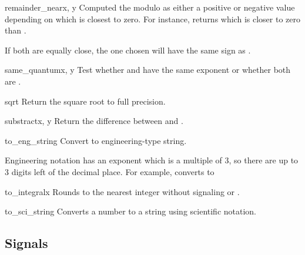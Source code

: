 \begin{methoddesc}{remainder_near}{x, y}
  Computed the modulo as either a positive or negative value depending
  on which is closest to zero.  For instance,
   returns 
  which is closer to zero than .

  If both are equally close, the one chosen will have the same sign
  as .
\end{methoddesc}

\begin{methoddesc}{same_quantum}{x, y}
  Test whether  and  have the same exponent or whether both are
  .
\end{methoddesc}

\begin{methoddesc}{sqrt}{}
  Return the square root to full precision.
\end{methoddesc}                    

\begin{methoddesc}{substract}{x, y}
  Return the difference between  and .
\end{methoddesc}
 
\begin{methoddesc}{to_eng_string}{}
  Convert to engineering-type string.

  Engineering notation has an exponent which is a multiple of 3, so there
  are up to 3 digits left of the decimal place.  For example, converts
   to 
\end{methoddesc}  

\begin{methoddesc}{to_integral}{x}                  
  Rounds to the nearest integer without signaling 
  or .                                        
\end{methoddesc} 

\begin{methoddesc}{to_sci_string}{}
  Converts a number to a string using scientific notation.
\end{methoddesc} 



\subsection{Signals \label{decimal-signals}}

